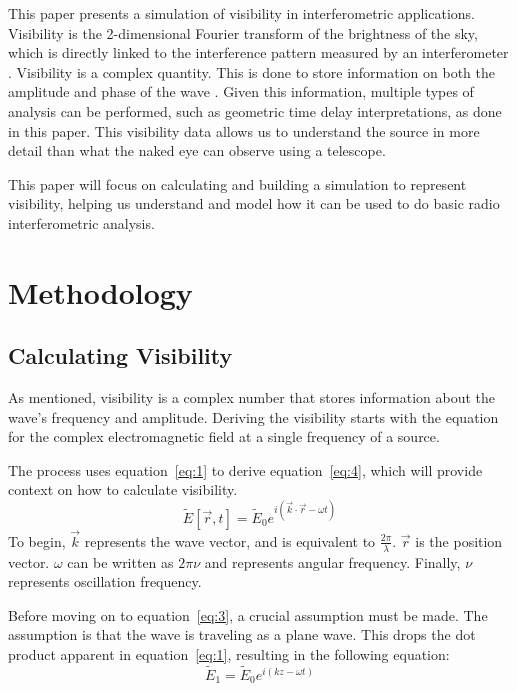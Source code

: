 \documentclass[12pt]{article}
\begin{document}
    This paper presents a simulation of visibility in interferometric applications. Visibility is the 2-dimensional Fourier transform of the brightness of the sky, which is directly linked to the interference pattern measured by an interferometer \cite{[3]}. Visibility is a complex quantity. This is done to store information on both the amplitude and phase of the wave \cite{[3]}. Given this information, multiple types of analysis can be performed, such as geometric time delay interpretations, as done in this paper. This visibility data allows us to understand the source in more detail than what the naked eye can observe using a telescope. 

    This paper will focus on calculating and building a simulation to represent visibility, helping us understand and model how it can be used to do basic radio interferometric analysis. 

    

\section{Methodology}
\subsection{Calculating Visibility}
\label{subsec:visibility}

As mentioned, visibility is a complex number that stores information about the wave's frequency and amplitude. Deriving the visibility starts with the equation for the complex electromagnetic field at a single frequency of a source.

The process uses equation~\ref{eq:1} to derive equation~\ref{eq:4}, which will provide context on how to calculate visibility. 
\begin{equation}
\tilde{E}[\vec{r}, t] = \tilde{E}_0 e^{i(\vec{k} \cdot \vec{r} - \omega t)}
\label{eq:1}
\end{equation}
To begin, $\vec{k}$ represents the wave vector, and is equivalent to $\frac{2\pi}{\lambda}$. $\vec{r}$ is the position vector. $\omega$ can be written as $2\pi\nu$ and represents angular frequency. Finally, $\nu$ represents oscillation frequency. 

Before moving on to equation~\ref{eq:3}, a crucial assumption must be made. The assumption is that the wave is traveling as a plane wave. This drops the dot product apparent in equation~\ref{eq:1}, resulting in the following equation:
\begin{equation}
\tilde{E}_1 = \tilde{E}_0 e^{i(kz - \omega t)}
\end{equation}
\end{document}
